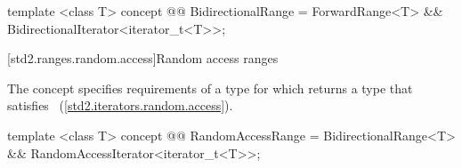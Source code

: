 \begin{codeblock}
template <class T>
concept @@ BidirectionalRange =
  ForwardRange<T> && BidirectionalIterator<iterator_t<T>>;
\end{codeblock}

[std2.ranges.random.access]{Random access ranges}

\pnum
The  concept specifies requirements of a
 type for which  returns a type that satisfies
~(\ref{std2.iterators.random.access}).

\begin{codeblock}
template <class T>
concept @@ RandomAccessRange =
  BidirectionalRange<T> && RandomAccessIterator<iterator_t<T>>;
\end{codeblock}
